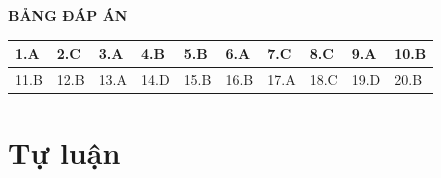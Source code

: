 \whiteBGstarEnd

\loigiai
{
	\begin{center}
		\textbf{BẢNG ĐÁP ÁN}
	\end{center}
	\begin{center}
		\begin{tabular}{|m{2.8em}|m{2.8em}|m{2.8em}|m{2.8em}|m{2.8em}|m{2.8em}|m{2.8em}|m{2.8em}|m{2.8em}|m{2.8em}|}
			\hline
			1.A  & 2.C  & 3.A  & 4.B  & 5.B  & 6.A  & 7.C  & 8.C  & 9.A  & 10.B  \\
			\hline
			11.B  & 12.B  & 13.A  & 14.D  & 15.B  & 16.B  & 17.A  & 18.C  & 19.D  & 20.B  \\
			\hline
		\end{tabular}
	\end{center}
}
\section{Tự luận}
